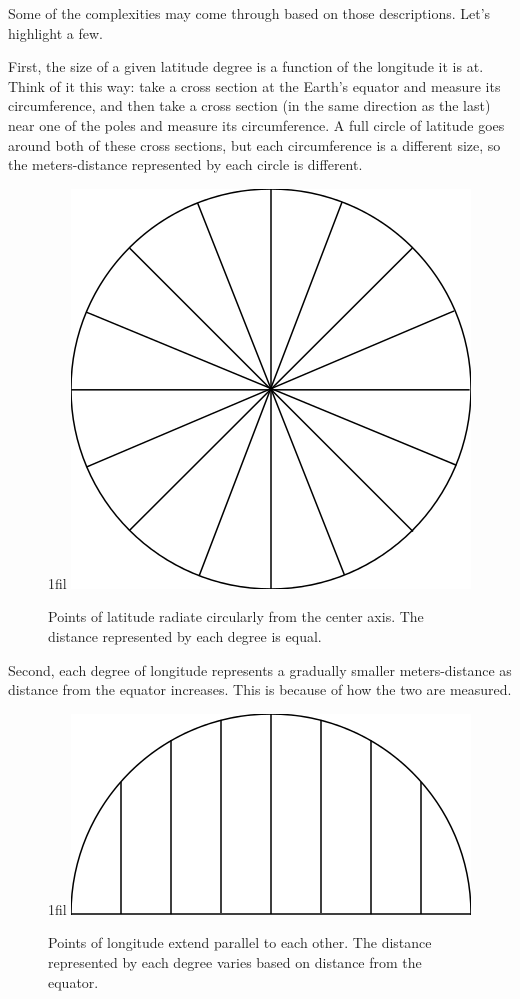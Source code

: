\documentclass[draftclsnofoot, onecolumn, letterpaper,10pt,compsoc]{IEEEtran}
\makeatletter
\newcommand*{\centerfloat}{%
  \parindent \z@
  \leftskip \z@ \@plus 1fil \@minus \textwidth
  \rightskip\leftskip
  \parfillskip \z@skip}
\makeatother
\begin{document}
Some of the complexities may come through based on those descriptions. Let's highlight a few. 

First, the size of a given latitude degree is a function of the longitude it is at. Think of it this way: take a cross section at the Earth's equator and measure its circumference, and then take a cross section (in the same direction as the last) near one of the poles and measure its circumference. A full circle of latitude goes around both of these cross sections, but each circumference is a different size, so the meters-distance represented by each circle is different. 

\begin{figure}[H]
    \centerfloat
    \includegraphics[scale=.5]{images/latitude.png}
    \caption{Points of latitude radiate circularly from the center axis. The distance represented by each degree is equal.}
\end{figure}

Second, each degree of longitude represents a gradually smaller meters-distance as distance from the equator increases. This is because of how the two are measured. 

\begin{figure}[H]
    \centerfloat
    \includegraphics[scale=.5]{images/longitude.png}
    \caption{Points of longitude extend parallel to each other. The distance represented by each degree varies based on distance from the equator.}
\end{figure}
\end{document}
